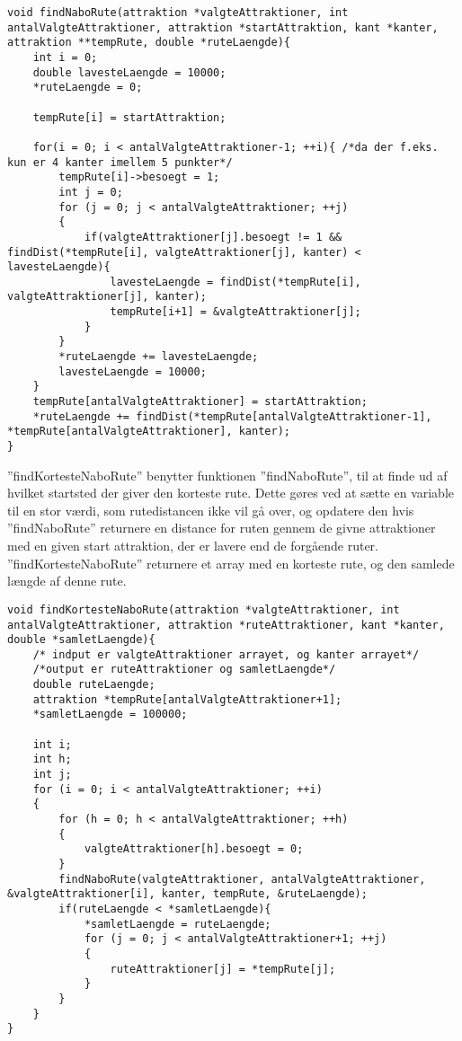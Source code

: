 \begin{lstlisting}
void findNaboRute(attraktion *valgteAttraktioner, int antalValgteAttraktioner, attraktion *startAttraktion, kant *kanter, attraktion **tempRute, double *ruteLaengde){
	int i = 0;
	double lavesteLaengde = 10000;
	*ruteLaengde = 0;

	tempRute[i] = startAttraktion;

	for(i = 0; i < antalValgteAttraktioner-1; ++i){ /*da der f.eks. kun er 4 kanter imellem 5 punkter*/
		tempRute[i]->besoegt = 1;
		int j = 0;
		for (j = 0; j < antalValgteAttraktioner; ++j)
		{
			if(valgteAttraktioner[j].besoegt != 1 && findDist(*tempRute[i], valgteAttraktioner[j], kanter) < lavesteLaengde){
				lavesteLaengde = findDist(*tempRute[i], valgteAttraktioner[j], kanter);
				tempRute[i+1] = &valgteAttraktioner[j];
			}
		}
		*ruteLaengde += lavesteLaengde;
		lavesteLaengde = 10000;
	}
	tempRute[antalValgteAttraktioner] = startAttraktion;
	*ruteLaengde += findDist(*tempRute[antalValgteAttraktioner-1], *tempRute[antalValgteAttraktioner], kanter);
}
\end{lstlisting}

”findKortesteNaboRute” benytter funktionen ”findNaboRute”, til at finde ud af hvilket startsted der giver den korteste rute. Dette gøres ved at sætte en variable til en stor værdi, som rutedistancen ikke vil gå over, og opdatere den hvis ”findNaboRute” returnere en distance for ruten gennem de givne attraktioner med en given start attraktion, der er lavere end de forgående ruter. ”findKortesteNaboRute” returnere et array med en korteste rute, og den samlede længde af denne rute. 

\begin{lstlisting}
void findKortesteNaboRute(attraktion *valgteAttraktioner, int antalValgteAttraktioner, attraktion *ruteAttraktioner, kant *kanter, double *samletLaengde){
	/* indput er valgteAttraktioner arrayet, og kanter arrayet*/
	/*output er ruteAttraktioner og samletLaengde*/
	double ruteLaengde;
	attraktion *tempRute[antalValgteAttraktioner+1];
	*samletLaengde = 100000;
	
	int i;
	int h;
	int j;
	for (i = 0; i < antalValgteAttraktioner; ++i)
	{
		for (h = 0; h < antalValgteAttraktioner; ++h)
		{
			valgteAttraktioner[h].besoegt = 0;
		}
		findNaboRute(valgteAttraktioner, antalValgteAttraktioner, &valgteAttraktioner[i], kanter, tempRute, &ruteLaengde);
		if(ruteLaengde < *samletLaengde){
			*samletLaengde = ruteLaengde;
			for (j = 0; j < antalValgteAttraktioner+1; ++j)
			{
				ruteAttraktioner[j] = *tempRute[j];
			}
		}
	}
}
\end{lstlisting}

